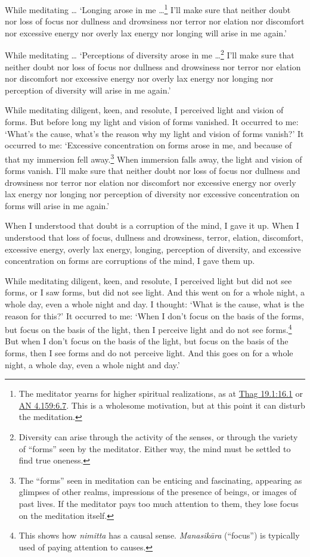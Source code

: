 \documentclass[12pt,openany]{book}%
\begin{document}
While meditating … ‘Longing arose in me …\footnote{The meditator yearns for higher spiritual realizations, as at \href{https://suttacentral.net/thag19.1/en/sujato\#16.1}{Thag 19.1:16.1} or \href{https://suttacentral.net/an4.159/en/sujato\#6.7}{AN 4.159:6.7}. This is a wholesome motivation, but at this point it can disturb the meditation. } I’ll make sure that neither doubt nor loss of focus nor dullness and drowsiness nor terror nor elation nor discomfort nor excessive energy nor overly lax energy nor longing will arise in me again.’ 

While meditating … ‘Perceptions of diversity arose in me …\footnote{Diversity can arise through the activity of the senses, or through the variety of “forms” seen by the meditator. Either way, the mind must be settled to find true oneness. } I’ll make sure that neither doubt nor loss of focus nor dullness and drowsiness nor terror nor elation nor discomfort nor excessive energy nor overly lax energy nor longing nor perception of diversity will arise in me again.’ 

While meditating diligent, keen, and resolute, I perceived light and vision of forms. But before long my light and vision of forms vanished. It occurred to me: ‘What’s the cause, what’s the reason why my light and vision of forms vanish?’ It occurred to me: ‘Excessive concentration on forms arose in me, and because of that my immersion fell away.\footnote{The “forms” seen in meditation can be enticing and fascinating, appearing as glimpses of other realms, impressions of the presence of beings, or images of past lives. If the meditator pays too much attention to them, they lose focus on the meditation itself. } When immersion falls away, the light and vision of forms vanish. I’ll make sure that neither doubt nor loss of focus nor dullness and drowsiness nor terror nor elation nor discomfort nor excessive energy nor overly lax energy nor longing nor perception of diversity nor excessive concentration on forms will arise in me again.’ 

When I understood that doubt is a corruption of the mind, I gave it up. When I understood that loss of focus, dullness and drowsiness, terror, elation, discomfort, excessive energy, overly lax energy, longing, perception of diversity, and excessive concentration on forms are corruptions of the mind, I gave them up. 

While meditating diligent, keen, and resolute, I perceived light but did not see forms, or I saw forms, but did not see light. And this went on for a whole night, a whole day, even a whole night and day. I thought: ‘What is the cause, what is the reason for this?’ It occurred to me: ‘When I don’t focus on the basis of the forms, but focus on the basis of the light, then I perceive light and do not see forms.\footnote{This shows how \textit{nimitta} has a causal sense. \textit{\textsanskrit{Manasikāra}} (“focus”) is typically used of paying attention to causes. } But when I don’t focus on the basis of the light, but focus on the basis of the forms, then I see forms and do not perceive light. And this goes on for a whole night, a whole day, even a whole night and day.’ 
\end{document}
